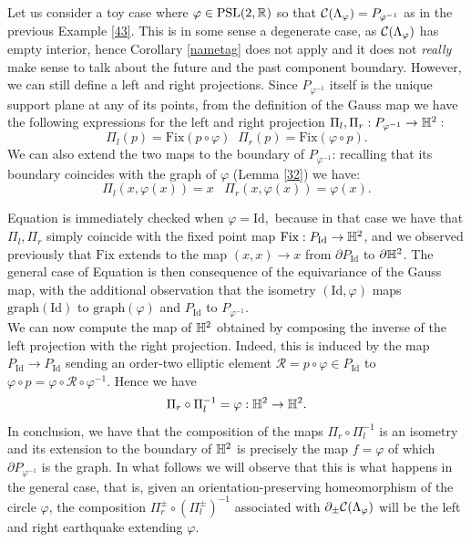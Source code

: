 \begin{example}\label{413} Let us consider a toy case where $\varphi\in\text{PSL}(2,\mathbb{R})$ so that $\mathcal{C}(\Lambda_\varphi)=P_{\varphi^{-1}}$ as in the previous Example \ref{43}. This is in some sense a degenerate case, as $\mathcal{C}(\Lambda_\varphi)$ has empty interior, hence Corollary \ref{nametag} does not apply and it does not \textit{really} make sense to talk about the future and the past component boundary. However, we can still define a left and right projections. Since $P_{\varphi^{-1}}$ itself is the unique support plane at any of its points, from the definition of the Gauss map we have the following expressions for the left and right projection $\Pi_l,\Pi_r:P_{\varphi^{-1}}\to\mathbb{H}^2:$
\begin{equation}\label{12}
    \Pi_l(p)=\text{Fix}(p\circ\varphi)\;\;\Pi_r(p)=\text{Fix}(\varphi\circ p).
\end{equation}   
We can also extend the two maps to the boundary of $P_{\varphi^{-1}}$: recalling that its boundary coincides with the graph of $\varphi$ (Lemma \ref{32}) we have: 
\begin{equation}\label{simproj}
    \Pi_l(x,\varphi(x))=x \;\;\;\Pi_r(x,\varphi(x))=\varphi(x). 
\end{equation}

Equation  is immediately checked when $\varphi=\text{Id},$ because in that case we have that $\Pi_l,\Pi_r$ simply coincide with the fixed point map $\text{Fix}:P_{\text{Id}}\to\mathbb{H}^2$, and we observed previously that $\text{Fix}$ extends to the map $(x,x)\to x$ from $\partial P_{\text{Id}}$ to $\partial\mathbb{H}^2$. The general case of Equation  is then consequence of the equivariance of the Gauss map, with the additional observation that the isometry $(\text{Id},\varphi)$ maps $\text{graph}(\text{Id})$ to $\text{graph}(\varphi)$ and $P_\text{Id}$ to $P_{\varphi^{-1}}$. \\
We can now compute the map of $\mathbb{H}^2$ obtained by composing the inverse of the left projection with the right projection. Indeed, this is induced by the map $P_{\text{Id}}\to P_\text{Id}$ sending an order-two elliptic element $\mathcal{R}=p\circ\varphi\in P_{\text{Id}}$ to $\varphi\circ p=\varphi\circ\mathcal{R}\circ\varphi^{-1}$. Hence we have   
\begin{equation}\label{composition}
    \Pi_r\circ\Pi_l^{-1}=\varphi:\mathbb{H}^2\to\mathbb{H}^2.
\end{equation}
In conclusion, we have that the composition of the maps $\Pi_r\circ\Pi_l^{-1}$ is an isometry and its extension to the boundary of $\mathbb{H}^2$ is precisely the map $f=\varphi$ of which $\partial P_{\varphi^{-1}}$ is the graph. In what follows we will observe that this is what happens in the general case, that is, given an orientation-preserving homeomorphism of the circle $\varphi$, the composition $\Pi_r^\pm\circ(\Pi_l^\pm)^{-1}$ associated with $\partial_\pm\mathcal{C}(\Lambda_\varphi)$ will be the left and right earthquake extending $\varphi$.
\end{example}

